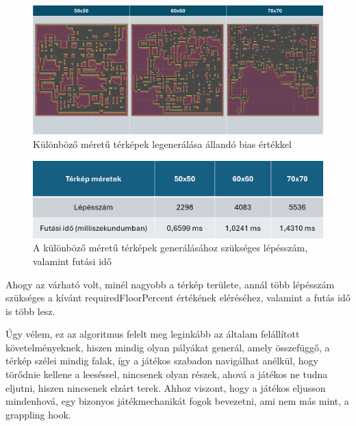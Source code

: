 \begin{figure}[ht]
\centering
\includegraphics[width=\textwidth]{images/fixedbiaschangingmapsize.png}
\caption{Különböző méretű térképek legenerálása állandó bias értékkel}
\label{fig:fixedbiaschangingmapsize}
\end{figure}

\begin{figure}[ht]
\centering
\includegraphics[width=\textwidth]{images/fixedbiaschangingmapsizestepcountruntime.png}
\caption{A különböző méretű térképek generálásához szükséges lépésszám, valamint futási idő}
\label{fig:fixedbiaschangingmapsizeruntimestepcount}
\end{figure}

\newpage
Ahogy az várható volt, minél nagyobb a térkép területe, annál több lépésszám szükséges a kívánt requiredFloorPercent értékének eléréséhez, valamint a futás idő is több lesz.

Úgy vélem, ez az algoritmus felelt meg leginkább az általam felállított követelményeknek, hiszen mindig olyan pályákat generál, amely összefüggő, a térkép szélei mindig falak, így a játékos szabadon navigálhat anélkül, hogy törődnie kellene a leeséssel, nincsenek olyan részek, ahová a játékos ne tudna eljutni, hiszen nincsenek elzárt terek. Ahhoz viszont, hogy a játékos eljusson mindenhová, egy bizonyos játékmechanikát fogok bevezetni, ami nem más mint, a grappling hook.


